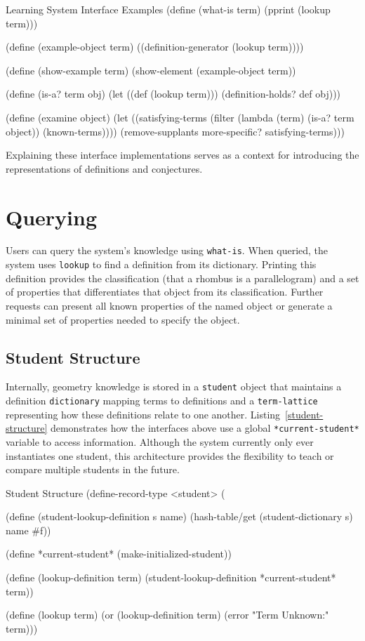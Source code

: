 \begin{code-example}
[label=l-interface]
{Learning System Interface Examples}
(define (what-is term)
  (pprint (lookup term)))

(define (example-object term)
  ((definition-generator (lookup term))))

(define (show-example term)
    (show-element (example-object term))

(define (is-a? term obj)
  (let ((def (lookup term)))
    (definition-holds? def obj)))

(define (examine object)
  (let ((satisfying-terms
         (filter (lambda (term) (is-a? term object))
           (known-terms))))
    (remove-supplants more-specific? satisfying-terms)))
\end{code-example}

Explaining these interface implementations serves as a context for
introducing the representations of definitions and conjectures.
\enlargethispage*{\baselineskip}

\section{Querying}

Users can query the system's knowledge using \texttt{what-is}. When
queried, the system uses \texttt{lookup} to find a definition from its
dictionary. Printing this definition provides the classification (that
a rhombus is a parallelogram) and a set of properties that
differentiates that object from its classification. Further requests
can present all known properties of the named object or generate a
minimal set of properties needed to specify the object.

\subsection{Student Structure}

Internally, geometry knowledge is stored in a \texttt{student} object
that maintains a definition \texttt{dictionary} mapping terms to
definitions and a \texttt{term-lattice} representing how these
definitions relate to one another. Listing~\ref{student-structure}
demonstrates how the interfaces above use a global
\texttt{*current-student*} variable to access information. Although
the system currently only ever instantiates one student, this
architecture provides the flexibility to teach or compare multiple
students in the future.

\begin{code-listing}
[label=student-structure]
{Student Structure}
(define-record-type <student>
  (%

(define (student-lookup-definition s name)
  (hash-table/get (student-dictionary s) name #f))

(define *current-student* (make-initialized-student))

(define (lookup-definition term)
  (student-lookup-definition *current-student* term))

(define (lookup term)
  (or (lookup-definition term) (error "Term Unknown:" term)))
\end{code-listing}

